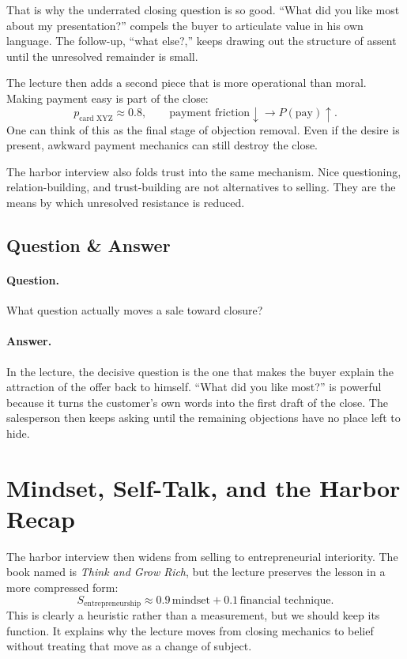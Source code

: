 That is why the underrated closing question is so good. ``What did you like most about my presentation?'' compels the buyer to articulate value in his own language. The follow-up, ``what else?,'' keeps drawing out the structure of assent until the unresolved remainder is small.

The lecture then adds a second piece that is more operational than moral. Making payment easy is part of the close:
\begin{equation}
p_{\text{card XYZ}} \approx 0.8,
\qquad
\text{payment friction}\downarrow \to P(\text{pay})\uparrow.
\end{equation}
One can think of this as the final stage of objection removal. Even if the desire is present, awkward payment mechanics can still destroy the close.

The harbor interview also folds trust into the same mechanism. Nice questioning, relation-building, and trust-building are not alternatives to selling. They are the means by which unresolved resistance is reduced.

\subsection{Question \& Answer}

\paragraph{Question.} What question actually moves a sale toward closure?

\paragraph{Answer.} In the lecture, the decisive question is the one that makes the buyer explain the attraction of the offer back to himself. ``What did you like most?'' is powerful because it turns the customer's own words into the first draft of the close. The salesperson then keeps asking until the remaining objections have no place left to hide.

\section{Mindset, Self-Talk, and the Harbor Recap}

The harbor interview then widens from selling to entrepreneurial interiority. The book named is \emph{Think and Grow Rich}, but the lecture preserves the lesson in a more compressed form:
\begin{equation}
S_{\text{entrepreneurship}} \approx 0.9\,\text{mindset}+0.1\,\text{financial technique}.
\end{equation}
This is clearly a heuristic rather than a measurement, but we should keep its function. It explains why the lecture moves from closing mechanics to belief without treating that move as a change of subject.

